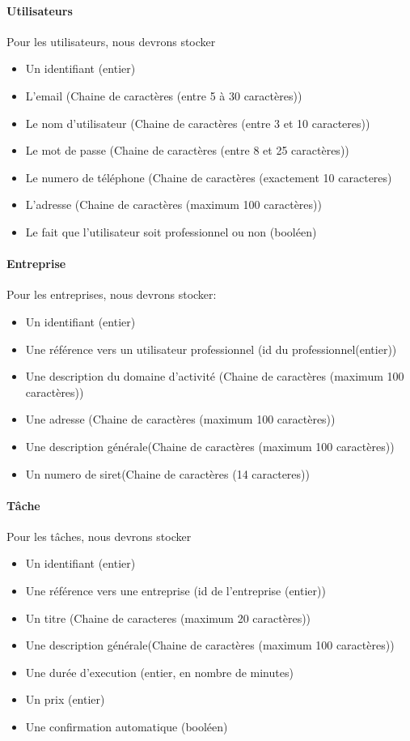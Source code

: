 \documentclass{article}
\begin{document}
\paragraph{Utilisateurs}
Pour les utilisateurs, nous devrons stocker
\begin{itemize}
\item Un identifiant (entier)
\item L'email (Chaine de caractères (entre 5 à 30 caractères))
\item Le nom d'utilisateur (Chaine de caractères (entre 3 et 10 caracteres))
\item Le mot de passe (Chaine de caractères (entre 8 et 25 caractères))
\item Le numero de téléphone (Chaine de caractères (exactement 10 caracteres)
\item L'adresse (Chaine de caractères (maximum 100 caractères))
\item Le fait que l'utilisateur soit professionnel ou non (booléen)
\end{itemize}

\paragraph{Entreprise}
Pour les entreprises, nous devrons stocker:
\begin{itemize}
\item Un identifiant (entier)
\item Une référence vers un utilisateur professionnel (id du professionnel(entier)) 
\item Une description du domaine d'activité (Chaine de caractères (maximum 100 caractères))
\item Une adresse (Chaine de caractères (maximum 100 caractères))
\item Une description générale(Chaine de caractères (maximum 100 caractères))
\item Un numero de siret(Chaine de caractères (14 caracteres))
\end{itemize}

\paragraph{Tâche}
Pour les tâches, nous devrons stocker
\begin{itemize}
\item Un identifiant (entier)
\item Une référence vers une entreprise (id de l'entreprise (entier))
\item Un titre (Chaine de caracteres (maximum 20 caractères))
\item Une description générale(Chaine de caractères (maximum 100 caractères))
\item Une durée d'execution (entier, en nombre de minutes)
\item Un prix (entier)
\item Une confirmation automatique (booléen)
\end{itemize}
\end{document}
